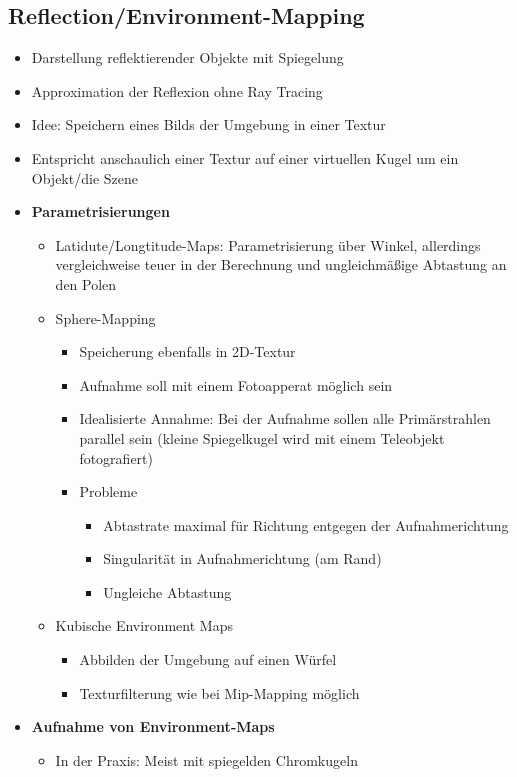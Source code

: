 \subsection{Reflection/Environment-Mapping}
\begin{itemize}
	\item Darstellung reflektierender Objekte mit Spiegelung
	\item Approximation der Reflexion ohne Ray Tracing
	\item Idee: Speichern eines Bilds der Umgebung in einer Textur
	\item Entspricht anschaulich einer Textur auf einer virtuellen Kugel um ein Objekt/die Szene
	\item \textbf{Parametrisierungen}
	\begin{itemize}
		\item Latidute/Longtitude-Maps: Parametrisierung über Winkel, allerdings vergleichweise teuer in der Berechnung und ungleichmäßige Abtastung an den Polen
		\item Sphere-Mapping
		\begin{itemize}
			\item Speicherung ebenfalls in 2D-Textur
			\item Aufnahme soll mit einem Fotoapperat möglich sein
			\item Idealisierte Annahme: Bei der Aufnahme sollen alle Primärstrahlen parallel sein (kleine Spiegelkugel wird mit einem Teleobjekt fotografiert)
			\item Probleme
			\begin{itemize}
				\item Abtastrate maximal für Richtung entgegen der Aufnahmerichtung
				\item Singularität in Aufnahmerichtung (am Rand)
				\item Ungleiche Abtastung
			\end{itemize}
		\end{itemize}
		\item Kubische Environment Maps
		\begin{itemize}
			\item Abbilden der Umgebung auf einen Würfel
			\item Texturfilterung wie bei Mip-Mapping möglich
		\end{itemize}
	\end{itemize}
	\item \textbf{Aufnahme von Environment-Maps}
	\begin{itemize}
		\item In der Praxis: Meist mit spiegelden Chromkugeln

\end{itemize}
\end{itemize}
